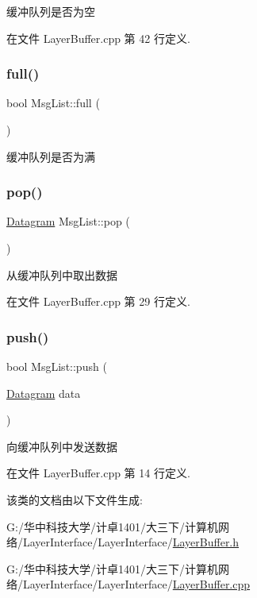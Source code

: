 缓冲队列是否为空 

在文件 Layer\+Buffer.\+cpp 第 42 行定义.

\mbox{\label{class_msg_list_abd998216b6c6566b0f06ab03806104aa}} 
\subsubsection{\texorpdfstring{full()}{full()}}
{\footnotesize\ttfamily bool Msg\+List\+::full (\begin{DoxyParamCaption}{ }\end{DoxyParamCaption})}

缓冲队列是否为满 \mbox{\label{class_msg_list_ac5ceb41e509380bbdb449098de3da0fb}} 
\subsubsection{\texorpdfstring{pop()}{pop()}}
{\footnotesize\ttfamily \hyperlink{class_datagram}{Datagram} Msg\+List\+::pop (\begin{DoxyParamCaption}{ }\end{DoxyParamCaption})}

从缓冲队列中取出数据 

在文件 Layer\+Buffer.\+cpp 第 29 行定义.

\mbox{\label{class_msg_list_addbf007ab42e18737a91928e9d8efb84}} 
\subsubsection{\texorpdfstring{push()}{push()}}
{\footnotesize\ttfamily bool Msg\+List\+::push (\begin{DoxyParamCaption}\item[{\hyperlink{class_datagram}{Datagram}}]{data }\end{DoxyParamCaption})}

向缓冲队列中发送数据 

在文件 Layer\+Buffer.\+cpp 第 14 行定义.



该类的文档由以下文件生成\+:\begin{DoxyCompactItemize}
\item 
G\+:/华中科技大学/计卓1401/大三下/计算机网络/\+Layer\+Interface/\+Layer\+Interface/\hyperlink{_layer_buffer_8h}{Layer\+Buffer.\+h}\item 
G\+:/华中科技大学/计卓1401/大三下/计算机网络/\+Layer\+Interface/\+Layer\+Interface/\hyperlink{_layer_buffer_8cpp}{Layer\+Buffer.\+cpp}\end{DoxyCompactItemize}
